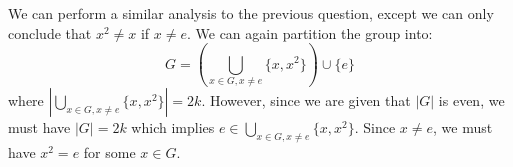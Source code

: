 \begin{sol}
    We can perform a similar analysis to the previous question, except we can only conclude that $x^2 \neq x$ if $x \neq e$. We can again partition the group into:
    \begin{equation}
        G = \left(\bigcup_{x \in G, x\neq e} \{x,x^2\}\right) \cup \{e\}
    \end{equation}
    where $\left|\bigcup_{x \in G, x\neq e} \{x,x^2\}\right| = 2k$. However, since we are given that $|G|$ is even, we must have $|G|=2k$ which implies  $e \in \bigcup_{x \in G, x\neq e} \{x,x^2\}$. Since $x\neq e$, we must have $x^2=e$ for some $x \in G$.
\end{sol}